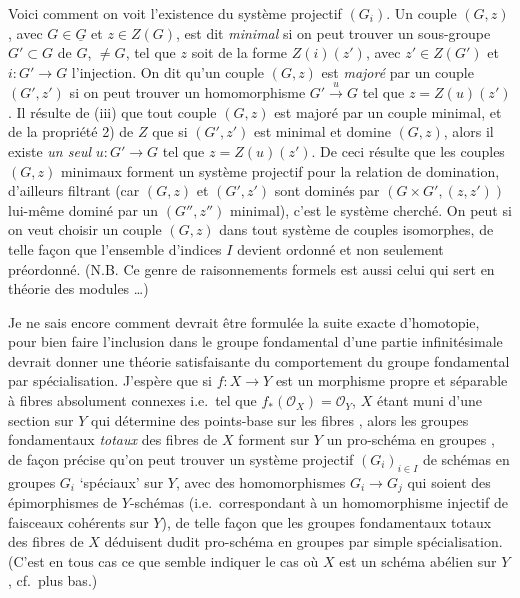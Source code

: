 \documentclass[11pt,a4paper]{article}
\begin{document}
Voici comment on voit l'existence du système projectif $(G_{i})$. Un couple
$(G, z)$, avec $G \in \underline{G}$ et $z \in Z(G)$, est dit \emph{minimal} si
on  peut trouver un sous-groupe $G' \subset G$ de $G$, \struck{\ill{}} $\neq
G$, tel que $z$ soit  de la forme $Z(i)(z')$, avec $z' \in Z(G')$
et $i : G' \to G$ l'injection. \struck{\ill{}} On dit qu'un couple $(G, z)$ est
\emph{majoré} par un couple $(G', z')$ si on peut trouver un homomorphisme
$G' \xrightarrow{\;u\;} G$ tel que $z = Z(u)(z')$. Il résulte de (iii) que tout
couple $(G, z)$ est majoré par un couple minimal, et de la propriété 2) de $Z$
que si $(G', z')$ est minimal et domine $(G, z)$, alors il existe
\emph{un seul} $u : G' \to G$ tel que $z = Z(u)(z')$. De ceci résulte que les
couples $(G, z)$ minimaux forment un système projectif pour la relation de
domination, d'ailleurs filtrant (car $(G, z)$ et $(G', z')$ sont dominés par
$(G \times G', (z, z'))$ lui-même dominé par un $(G'', z'')$ minimal), c'est le
système cherché. On peut si on veut choisir un couple $(G, z)$ dans tout
système de couples  isomorphes, de \struck{\ill{}} telle façon
que l'ensemble d'indices \struck{\ill{}} $I$ devient ordonné et non seulement
préordonné. (N.B. Ce genre de raisonnements formels est aussi celui qui sert en
théorie des \struck{\ill{}} modules \ldots)

Je ne sais encore comment devrait être formulée la suite exacte d'homotopie,
pour bien faire l'inclusion dans le groupe fondamental d'une partie
infinitésimale devrait donner une théorie satisfaisante du comportement du
groupe fondamental par spécialisation. J'espère que si $f : X \to Y$ est un
morphisme propre et séparable à fibres absolument connexes i.e.\ tel que
$f_{*}(\mathcal{O}_{X}) = \mathcal{O}_{Y}$, $X$ étant muni \struck{\ill{}}
d'une section sur $Y$ qui détermine des points-base sur les fibres
, alors les groupes fondamentaux \emph{totaux} des
fibres de $X$ forment sur $Y$ un pro-schéma en groupes , de façon
précise qu'on peut trouver un système projectif 
$(G_{i})_{i \in I}$ de schémas en groupes $G_{i}$ `spéciaux' sur $Y$, avec des
homomorphismes $G_{i} \to G_{j}$ qui soient des épimorphismes de $Y$-schémas
(i.e.\ correspondant à un homomorphisme injectif de faisceaux cohérents sur
$Y$), de telle façon que les groupes fondamentaux totaux des fibres de $X$
\struck{\ill{}} déduisent dudit pro-schéma en groupes par simple
spécialisation. (C'est en tous cas ce que semble indiquer le cas où $X$ est un
schéma abélien sur $Y$, cf.\ plus bas.)
\end{document}

